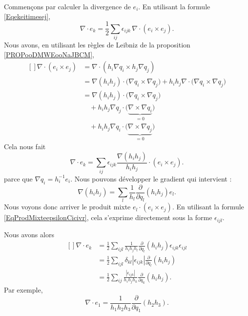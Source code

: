 Commençons par calculer la divergence de \( e_i\). En utilisant la formule \eqref{Eqekeitimesej},
\begin{equation}
	\nabla\cdot e_k=\frac{ 1 }{2}\sum_{ij}\epsilon_{ijk}\,\nabla\cdot (e_i\times e_j).
\end{equation}
Nous avons, en utilisant les règles de Leibniz de la proposition \ref{PROPooDMWEooNaJBCM},
\begin{equation}
	\begin{aligned}[]
		\nabla\cdot(e_i\times e_j) & =\nabla\cdot(h_i\nabla q_i\times h_j\nabla q_j)                                                                    \\
		                           & =\nabla(h_ih_j)\cdot\big( \nabla q_i\times\nabla q_j \big)+h_ih_j\nabla\cdot\big( \nabla q_i\times\nabla q_j \big) \\
		                           & =\nabla(h_ih_j)\cdot\big( \nabla q_i\times\nabla q_j \big)                                                         \\
		                           & \quad+h_ih_j\nabla q_j\cdot\big( \underbrace{\nabla\times\nabla q_i}_{=0} \big)                                    \\
		                           & \quad+h_ih_j\nabla q_i\cdot\big( \underbrace{\nabla\times\nabla q_j}_{=0} \big)
	\end{aligned}
\end{equation}
Cela nous fait
\begin{equation}
	\nabla\cdot e_k=\sum_{ij}\epsilon_{ijk}\frac{ \nabla(h_ih_j) }{ h_ih_j }\cdot (e_i\times e_j).
\end{equation}
parce que \( \nabla q_i=h_i^{-1}e_i\). Nous pouvons développer le gradient qui intervient :
\begin{equation}
	\nabla(h_ih_j)=\sum_l\frac{1}{ h_l }\frac{ \partial  }{ \partial q_l }(h_ih_j)e_l.
\end{equation}
Nous voyons donc arriver le produit mixte \( e_l\cdot (e_i\times e_j)\). En utilisant la formule \eqref{EqProdMixteepsilonCicivr}, cela s'exprime directement sous la forme \( \epsilon_{ijl}\).

Nous avons alors
\begin{equation}        \label{EqFragradekdvi}
	\begin{aligned}[]
		\nabla\cdot e_k & =\frac{ 1 }{2}\sum_{ijl}\frac{1}{ h_ih_jh_l }\frac{ \partial  }{ \partial q_l }(h_ih_j)\epsilon_{ijk}\epsilon_{ijl} \\
		                & =\frac{ 1 }{2}\sum_{ijl}\delta_{kl}| \epsilon_{ijk} |\frac{ \partial  }{ \partial q_l }(h_ih_j)                     \\
		                & =\frac{ 1 }{2}\sum_{ij}\frac{| \epsilon_{ijk} |}{ h_ih_jh_k }\frac{ \partial  }{ \partial q_k }(h_ih_j).
	\end{aligned}
\end{equation}
Par exemple,
\begin{equation}
	\nabla\cdot e_1=\frac{1}{ h_1h_2h_3 }\frac{ \partial  }{ \partial q_1 }(h_2h_3).
\end{equation}

